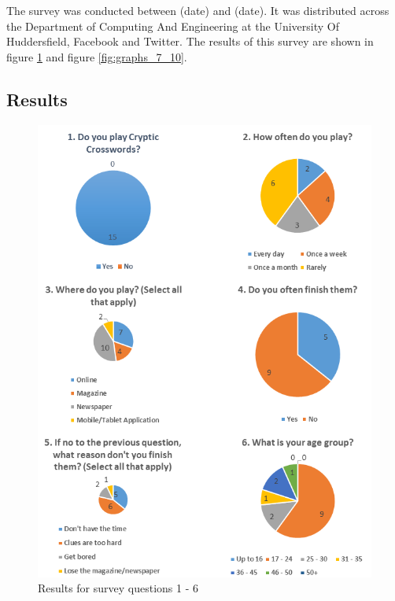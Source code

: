 The survey was conducted between (date) and (date). It was distributed across
the Department of Computing And Engineering at the University Of Huddersfield,
Facebook and Twitter. The results of this survey are shown in figure
\ref{fig:graphs_1_6} and figure \ref{fig:graphs_7_10}.


\subsection{Results}

\begin{figure}[H]
  \centering
  \includegraphics[scale=0.8]{graphs_1_6.png}
  \caption{Results for survey questions 1 - 6}
  \label{fig:graphs_1_6}
\end{figure}

